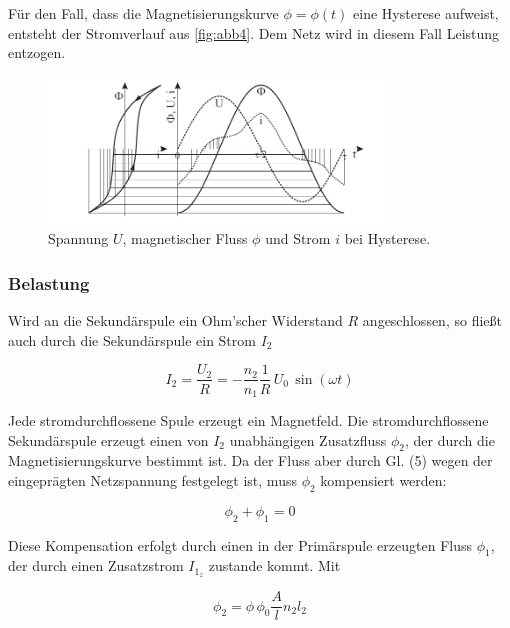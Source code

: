 \documentclass[11pt,ngerman]{scrartcl}
\begin{document}
Für den Fall, dass die Magnetisierungskurve $\phi = \phi (t)$ eine Hysterese aufweist, entsteht der
Stromverlauf aus \autoref{fig:abb4}. Dem Netz wird in diesem Fall Leistung entzogen.

\begin{figure}[H]
	\begin{center}
		\includegraphics[width=0.8\textwidth]{abb4}
	\end{center}
	\caption{Spannung $U$, magnetischer Fluss $\phi$ und Strom $i$ bei Hysterese.}
	\label{fig:abb4}
\end{figure}

\subsubsection{Belastung}

Wird an die Sekundärspule ein Ohm’scher Widerstand $R$ angeschlossen, so fließt auch durch
die Sekundärspule ein Strom $I_2$

\begin{equation}
	I_2 = \frac{U_2}{R} = -\frac{n_2}{n_1}\frac{1}{R} \,U_0\, \sin{(\omega t)}
\end{equation}

Jede stromdurchflossene Spule erzeugt ein Magnetfeld. Die stromdurchflossene Sekundärspule
erzeugt einen von $I_2$ unabhängigen Zusatzfluss $\phi_2$, der durch die Magnetisierungskurve bestimmt
ist. Da der Fluss aber durch Gl. (5) wegen der eingeprägten Netzspannung festgelegt ist, muss
$\phi_2$ kompensiert werden:

\begin{equation}
	\phi_2 + \phi_1 = 0
\end{equation}

Diese Kompensation erfolgt durch einen in der Primärspule erzeugten Fluss $\phi_1$, der durch einen
Zusatzstrom $I_{1_z}$ zustande kommt. Mit

\begin{equation}
	\phi_2 = \phi \, \phi_0 \frac{A}{l}n_2 l_2
\end{equation}
\end{document}
